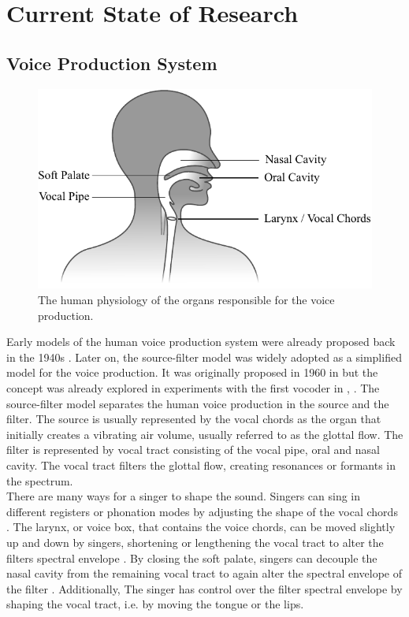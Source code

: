 
\chapter{Current State of Research}

\section{Voice Production System}

\begin{figure} [H]
    \centering
    \includegraphics{Graphics/002_VoiceProduction_Physiology.pdf}
    \caption{The human physiology of the organs responsible for the voice production.}
    \label{fig:physiology}
\end{figure}

Early models of the human voice production system were already proposed back in the 1940s \cite{chiba_vowel_1942}. Later on, the source-filter model was widely adopted as a simplified model for the voice production. It was originally proposed in 1960 in \cite{fant_acoustic_1960} but the concept was already explored in experiments with the first vocoder in \cite{dudley_vocoder_1939}, \cite{dudley_remaking_1939}. The source-filter model separates the human voice production in the source and the filter. The source is usually represented by the vocal chords as the organ that initially creates a vibrating air volume, usually referred to as the glottal flow. The filter is represented by vocal tract consisting of the vocal pipe, oral and nasal cavity. The vocal tract filters the glottal flow, creating resonances or formants in the spectrum. \\
There are many ways for a singer to shape the sound. Singers can sing in different registers or phonation modes\cite{sundberg_science_1987} by adjusting the shape of the vocal chords \cite{salomao_what_2009}. The larynx, or voice box, that contains the voice chords, can be moved slightly up and down by singers, shortening or lengthening the vocal tract to alter the filters spectral envelope \cite{sundberg_raised_1976}. By closing the soft palate, singers can decouple the nasal cavity from the remaining vocal tract to again alter the spectral envelope of the filter \cite{elie_characterisation_2009}. Additionally, The singer has control over the filter spectral envelope by shaping the vocal tract, i.e. by moving the tongue or the lips.

